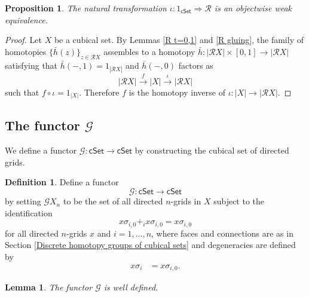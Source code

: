 \documentclass[oneside, 12pt]{amsart}
\numberwithin{equation}{section}
\theoremstyle{plain}
\newtheorem{proposition}[theorem]{Proposition}
\newtheorem{lemma}[theorem]{Lemma}
\theoremstyle{definition}
\newtheorem{definition}[theorem]{Definition}
\theoremstyle{remark}
\newcommand{\cSet}{\mathsf{cSet}}
\begin{document}
	
	
	\begin{proposition}
		\label{R}
		The natural transformation $\iota\colon 1_{\cSet}\Rightarrow\mathcal{R}$ is an objectwise weak equivalence.
	\end{proposition}
	
	\begin{proof}
		Let $X$ be a cubical set. By Lemmas \ref{R t=0,1} and \ref{R gluing}, the family of homotopies $\{\bar{h}(z)\}_{z\in\mathcal{R}X}$ assembles to a homotopy $\bar{h}\colon|\mathcal{R}X|\times[0,1]\to|\mathcal{R}X|$ satisfying that $\bar{h}(-,1)=1_{|\mathcal{R}X|}$ and $\bar{h}(-,0)$ factors as
		\[
		|\mathcal{R}X|\xrightarrow{f}|X|\xrightarrow{\iota}|\mathcal{R}X|
		\]
		such that $f\circ\iota=1_{|X|}$. Therefore $f$ is the homotopy inverse of $\iota\colon|X|\to|\mathcal{R}X|$.
	\end{proof}
	
	
	
	\subsection{The functor $\mathcal{G}$}
	
	We define a functor $\mathcal{G}\colon\cSet\to\cSet$ by constructing the cubical set of directed grids.
	
	
	
	\begin{definition}
		Define a functor
		\[
		\mathcal{G}\colon\cSet\to\cSet
		\]
		by setting $\mathcal{G}X_n$ to be the set of all directed $n$-grids in $X$ subject to the identification
		\begin{equation}
			\label{G identification}
			x\sigma_{i,0}+_ix\sigma_{i,0}=x\sigma_{i,0}
		\end{equation}
		for all directed $n$-grids $x$ and $i=1,\ldots,n$, where faces and connections are as in Section \ref{Discrete homotopy groups of cubical sets} and degeneracies are defined by
		\begin{align*}
			x\sigma_i&=x\sigma_{i,0}.
		\end{align*}
		
	\end{definition}
	
	
	
	\begin{lemma}
		\label{G well defined}
		The functor $\mathcal{G}$ is well defined.
	\end{lemma}
	
\end{document}

